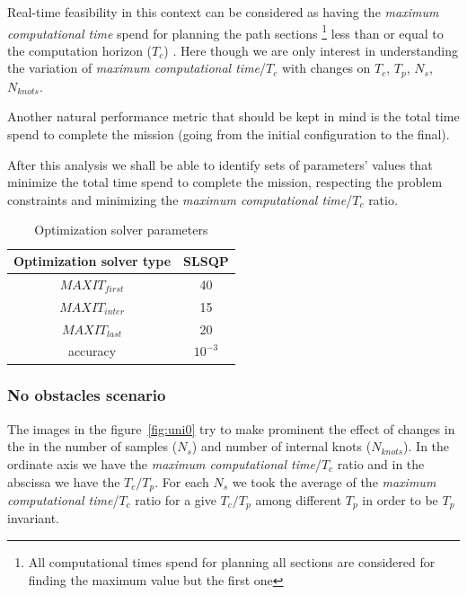 
Real-time feasibility in this context can be considered as having the \textit{maximum computational time} spend for planning the path sections \footnote{All computational times spend for planning all sections are considered for finding the maximum value but the first one} less than or equal to the computation horizon ($T_c$) . Here though we are only interest in understanding the variation of \textit{maximum computational time}/$T_c$ with changes on $T_c$, $T_p$, $N_s$, $N_{knots}$.

Another natural performance metric that should be kept in mind is the total time spend to complete the mission (going from the initial configuration to the final).

After this analysis we shall be able to identify sets of parameters' values that minimize the total time spend to complete the mission, respecting the problem constraints and minimizing the \textit{maximum computational time}/$T_c$ ratio.

\begin{table}[!h]
\caption {Optimization solver parameters} \label{tab:optparam}
\begin{center}
\begin{tabular}{|c|c|}
\hline
Optimization solver type & SLSQP\\
\hline
$MAXIT_{first}$ & 40\\
\hline
$MAXIT_{inter}$ & 15\\
\hline
$MAXIT_{last}$ & 20\\
\hline
accuracy & $10^{-3}$\\
\hline
\end{tabular}
\end{center}
\end{table}

\subsubsection{No obstacles scenario}

The images in the figure~\ref{fig:uni0} try to make prominent the effect of changes in the in the number of samples ($N_s$) and number of internal knots ($N_{knots}$). In the ordinate axis we have the \textit{maximum computational time}/$T_c$ ratio and in the abscissa we have the $T_c/T_p$. For each $N_s$ we took the average of the \textit{maximum computational time}/$T_c$ ratio for a give $T_c/T_p$ among different $T_p$ in order to be $T_p$ invariant.

